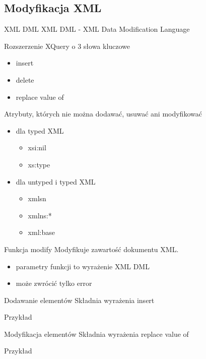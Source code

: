 \subsection{Modyfikacja XML}
	\begin{frame}{XML DML}
		XML DML - XML Data Modification Language
		
		Rozszerzenie XQuery o 3 słowa kluczowe 	
	   	\begin{itemize}
		  \item insert
		  \item delete
		  \item replace value of
		\end{itemize}
		
		Atrybuty, których nie można dodawać, usuwać ani modyfikować
		\begin{itemize}
		  \item dla typed XML
		  	\begin{itemize}
		  		\item xsi:nil
		  		\item xs:type
		  	\end{itemize} 
		  	\item dla untyped i typed XML
		  	\begin{itemize}
		  		\item xmlsn
		  		\item xmlns:*
		  		\item xml:base
		  	\end{itemize} 
		\end{itemize}
	\end{frame}
	
	\begin{frame}{Funkcja modify}
		Modyfikuje zawartość dokumentu XML.
		 	
	   	\begin{itemize}
		  \item parametry funkcji to wyrażenie XML DML
		  \item może zwrócić tylko error
		\end{itemize}
	\end{frame}
	
	\begin{frame}{Dodawanie elementów}
		Składnia wyrażenia insert
		
	
		Przykład
		
	\end{frame}
	
	\begin{frame}{Modyfikacja elementów}
		Składnia wyrażenia replace value of
		
	
		Przykład
		
	\end{frame}
	
